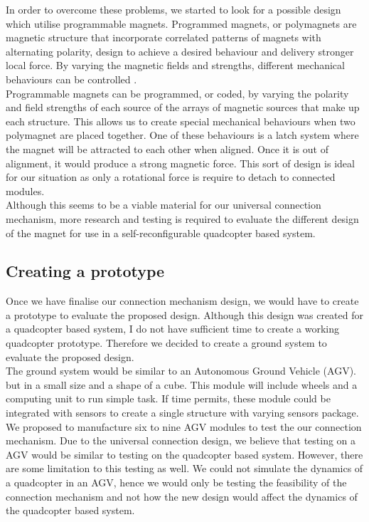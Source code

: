 \documentclass[12pt,A4]{article}
\begin{document}
	In order to overcome these problems, we started to look for a possible design which utilise programmable magnets. Programmed magnets, or polymagnets are magnetic structure that incorporate correlated patterns of magnets with alternating polarity, design to achieve a desired behaviour and delivery stronger local force. By varying the magnetic fields and strengths, different mechanical behaviours can be controlled \citep{polymagnet2008}.\\
	
	Programmable magnets can be programmed, or coded, by varying the polarity and field strengths of each source of the arrays of magnetic sources that make up each structure. This allows us to create special mechanical behaviours when two polymagnet are placed together. One of these behaviours is a latch system where the magnet will be attracted to each other when aligned. Once it is out of alignment, it would produce a strong magnetic force. This sort of design is ideal for our situation as only a rotational force is require to detach to connected modules.\\
	
	Although this seems to be a viable material for our universal connection mechanism, more research and testing is required to evaluate the different design of the magnet for use in a self-reconfigurable quadcopter based system.\\
	
	\subsection{Creating a prototype}
	
	Once we have finalise our connection mechanism design, we would have to create a prototype to evaluate the proposed design. Although this design was created for a quadcopter based system, I do not have sufficient time to create a working quadcopter prototype. Therefore we decided to create a ground system to evaluate the proposed design.\\
	
	The ground system would be similar to an Autonomous Ground Vehicle (AGV). but in a small size and a shape of a cube. This module will include wheels and a computing unit to run simple task. If time permits, these module could be integrated with sensors to create a single structure with varying sensors package.\\
	
	We proposed to manufacture six to nine AGV modules to test the our connection mechanism. Due to the universal connection design, we believe that testing on a AGV would be similar to testing on the quadcopter based system. However, there are some limitation to this testing as well. We could not simulate the dynamics of a quadcopter in an AGV, hence we would only be testing the feasibility of the connection mechanism and not how the new design would affect the dynamics of the quadcopter based system.\\
	
\end{document}
